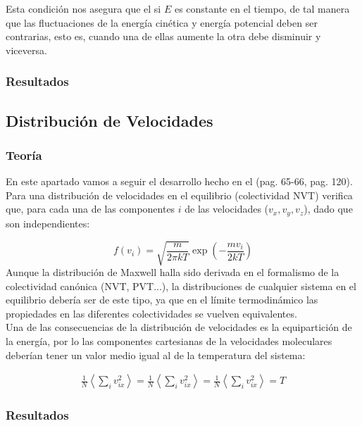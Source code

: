\documentclass[11pt]{article} %
\newcommand{\parentesis}[1]{\left( #1  \right)}
\begin{document}
Esta condición nos asegura que el si $E$ es constante en el tiempo, de tal manera que las fluctuaciones de la energía cinética y energía potencial deben ser contrarias, esto es, cuando una de ellas aumente la otra debe disminuir y viceversa.

\subsubsection{Resultados}

	
\subsection{Distribución de Velocidades}
	
\subsubsection{Teoría}

En este apartado vamos a seguir el desarrollo hecho en el \cite{Haile} (pag. 65-66, pag. 120). Para una distribución de velocidades en el equilibrio (colectividad NVT) verifica que, para cada una de las componentes $i$ de las velocidades ($v_x,v_y,v_z$), dado que son independientes: 

\begin{equation}
	f(v_i) = \sqrt{\frac{m}{2\pi k T}} \exp \parentesis{- \frac{mv_i}{2kT}}
\end{equation}
Aunque la distribución de Maxwell halla sido derivada en el formalismo de la colectividad canónica (NVT, PVT...), la distribuciones de cualquier sistema en el equilibrio debería ser de este tipo, ya que en el límite termodinámico las propiedades en las diferentes colectividades se vuelven equivalentes. \\

Una de las consecuencias de la distribución de velocidades es la equipartición de la energía, por lo las componentes cartesianas de la velocidades moleculares deberían tener un valor medio igual al de la temperatura del sistema:

\begin{eqnarray}
	\frac{1}{N} \left\langle \sum_i v_{ix}^2 \right\rangle = 
	\frac{1}{N} \left\langle \sum_i v_{ix}^2 \right\rangle = 
	\frac{1}{N} \left\langle \sum_i v_{ix}^2 \right\rangle = T
\end{eqnarray}
\subsubsection{Resultados}
\end{document}

